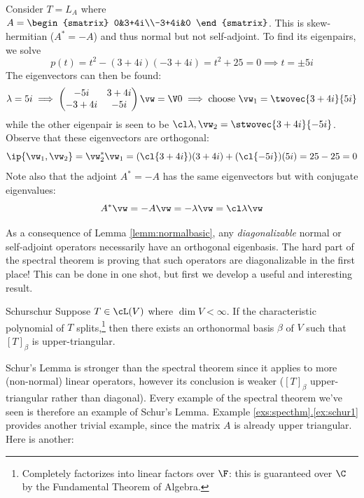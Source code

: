 \begin{example}[breakable]{}{}
Consider $T=L_A$ where $A=\begin{smatrix}
0&3+4i\\-3+4i&0
\end{smatrix}$. This is skew-hermitian ($A^*=-A$) and thus normal but not self-adjoint. To find its eigenpairs, we solve
\[p(t)=t^2-(3+4i)(-3+4i)=t^2+25=0\implies t=\pm 5i\]
The eigenvectors can then be found:
\[\lambda=5i\implies \begin{pmatrix}
  -5i&3+4i\\
  -3+4i&-5i
  \end{pmatrix}\vw=\V0\implies \text{choose }\vw_1=\twovec{3+4i}{5i}\]
  while the other eigenpair is seen to be $\cl\lambda,\vw_2=\stwovec{3+4i}{-5i}$. Observe that these eigenvectors are orthogonal:
\[\ip{\vw_1,\vw_2}=\vw_2^*\vw_1=(\cl{3+4i})(3+4i)+(\cl{-5i})(5i)= 25-25=0\]
Note also that the adjoint $A^*=-A$ has the same eigenvectors but with conjugate eigenvalues:
\[A^*\vw=-A\vw=-\lambda\vw=\cl\lambda\vw\]
\end{example}

As a consequence of Lemma \ref{lemm:normalbasic}, any \emph{diagonalizable} normal or self-adjoint operators necessarily have an orthogonal eigenbasis. The hard part of the spectral theorem is proving that such operators are diagonalizable in the first place! This can be done in one shot, but first we develop a useful and interesting result.

\begin{lemm}{Schur}{schur}
Suppose $T\in\cL(V)$ where $\dim V<\infty$. If the characteristic polynomial of $T$ splits,\footnote{Completely factorizes into linear factors over $\F$: this is guaranteed over $\C$ by the Fundamental Theorem of Algebra.} then there exists an orthonormal basis $\beta$ of $V$ such that $[T]_\beta$ is upper-triangular.
\end{lemm}

Schur's Lemma is stronger than the spectral theorem since it applies to more (non-normal) linear operators, however its conclusion is weaker ($[T]_\beta$ upper-triangular rather than diagonal). Every example of the spectral theorem we've seen is therefore an example of Schur's Lemma. Example \hyperref[ex:schur1]{\ref*{exs:specthm}.\ref*{ex:schur1}} provides another trivial example, since the matrix $A$ is already upper triangular. Here is another: 

